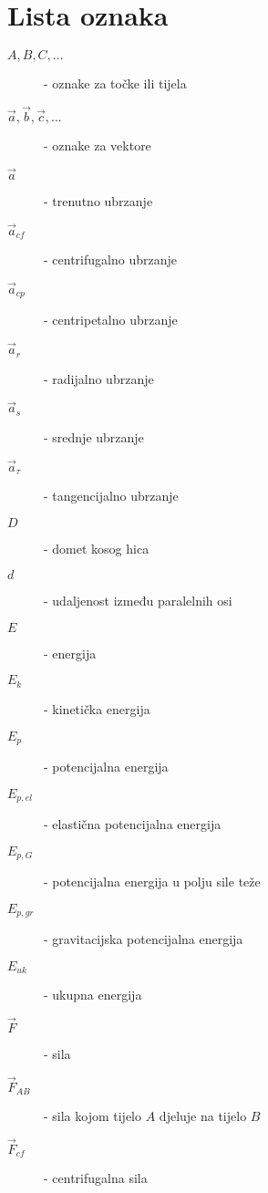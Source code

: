 \section*{Lista oznaka}


\begin{description}
  \item [\(A, B, C, ...\)] - oznake za točke ili tijela
  \item [\(\vec{a}, \vec{b}, \vec{c}, ...\)] - oznake za vektore
  \item [\(\vec{a}\)] - trenutno ubrzanje
  \item [\(\vec{a}_{c\!f}\)] - centrifugalno ubrzanje
  \item [\(\vec{a}_{cp}\)] - centripetalno ubrzanje
  \item [\(\vec{a}_r\)] - radijalno ubrzanje
  \item [\(\vec{a}_s\)] - srednje ubrzanje
  \item [\(\vec{a}_\tau\)] - tangencijalno ubrzanje
  \item [\(D\)] - domet kosog hica
  \item [\(d\)] - udaljenost između paralelnih osi
  \item [\(E\)] - energija
  \item [\(E_k\)] - kinetička energija
  \item [\(E_p\)] - potencijalna energija
  \item [\(E_{p,el}\)] - elastična potencijalna energija
  \item [\(E_{p,G}\)] - potencijalna energija u polju sile teže
  \item [\(E_{p,gr}\)] - gravitacijska potencijalna energija
  \item [\(E_{uk}\)] - ukupna energija
  \item [\(\vec{F}\)] - sila
  \item [\(\vec{F}_{AB}\)] - sila kojom tijelo \(A\) djeluje na tijelo \(B\)
  \item [\(\vec{F}_{cf}\)] - centrifugalna sila

\end{description}
